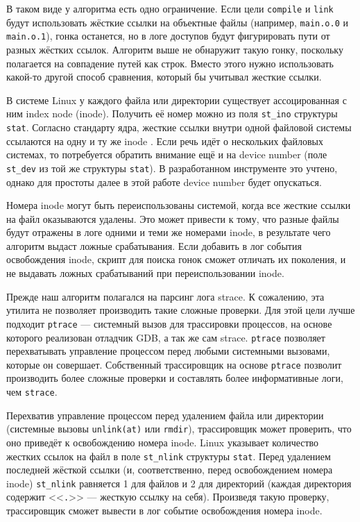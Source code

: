 В таком виде у алгоритма есть одно ограничение. Если цели \texttt{compile} и \texttt{link} будут использовать жёсткие ссылки на объектные файлы (например, \texttt{main.o.0} и \texttt{main.o.1}), гонка останется, но в логе доступов будут фигурировать пути от разных жёстких ссылок. Алгоритм выше не обнаружит такую гонку, поскольку полагается на совпадение путей как строк. Вместо этого нужно использовать какой-то другой способ сравнения, который бы учитывал жесткие ссылки.

В системе Linux у каждого файла или директории существует ассоцированная с ним index node (inode). Получить её номер можно из поля \texttt{st\_ino} структуры \texttt{stat}. Согласно стандарту ядра, жесткие ссылки внутри одной файловой системы ссылаются на одну и ту же inode \cite{inode-docs}. Если речь идёт о нескольких файловых системах, то потребуется обратить внимание ещё и на device number (поле \texttt{st\_dev} из той же структуры \texttt{stat}). В разработанном инструменте это учтено, однако для простоты далее в этой работе device number будет опускаться.

Номера inode могут быть переиспользованы системой, когда все жесткие ссылки на файл оказываются удалены. Это может привести к тому, что разные файлы будут отражены в логе одними и теми же номерами inode, в результате чего алгоритм выдаст ложные срабатывания. Если добавить в лог события освобождения inode, скрипт для поиска гонок сможет отличать их поколения, и не выдавать ложных срабатываний при переиспользовании inode.

Прежде наш алгоритм полагался на парсинг лога strace. К сожалению, эта утилита не позволяет производить такие сложные проверки. Для этой цели лучше подходит \texttt{ptrace} --- системный вызов для трассировки процессов, на основе которого реализован отладчик GDB, а так же сам strace. \texttt{ptrace} позволяет перехватывать управление процессом перед любыми системными вызовами, которые он совершает. Собственный трассировщик на основе \texttt{ptrace} позволит производить более сложные проверки и составлять более информативные логи, чем \texttt{strace}.

Перехватив управление процессом перед удалением файла или директории (системные вызовы \texttt{unlink(at)} или \texttt{rmdir}), трассировщик может проверить, что оно приведёт к освобождению номера inode. Linux указывает количество жестких ссылок на файл в поле \texttt{st\_nlink} структуры \texttt{stat}. Перед удалением последней жёсткой ссылки (и, соответственно, перед освобождением номера inode) \texttt{st\_nlink} равняется 1 для файлов и 2 для директорий (каждая директория содержит <<\texttt{.}>> --- жесткую ссылку на себя). Произведя такую проверку, трассировщик сможет вывести в лог событие освобождения номера inode.

